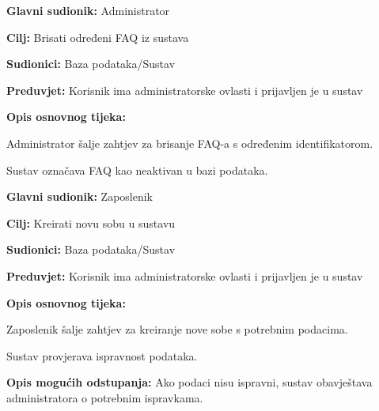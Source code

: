                 \noindent {}
					\begin{packed_item}
	
						\item \textbf{Glavni sudionik: }Administrator
						\item  \textbf{Cilj:} Brisati određeni FAQ iz sustava
						\item  \textbf{Sudionici:} Baza podataka/Sustav
						\item  \textbf{Preduvjet:} Korisnik ima administratorske ovlasti i prijavljen je u sustav
						\item  \textbf{Opis osnovnog tijeka:}
						
						\item[] \begin{packed_enum}
	
							\item Administrator šalje zahtjev za brisanje FAQ-a s određenim identifikatorom.
							\item Sustav označava FAQ kao neaktivan u bazi podataka.
	
						\end{packed_enum}

						
					\end{packed_item}

                \noindent {}
					\begin{packed_item}
	
						\item \textbf{Glavni sudionik: }Zaposlenik
						\item  \textbf{Cilj:} Kreirati novu sobu u sustavu
						\item  \textbf{Sudionici:} Baza podataka/Sustav
						\item  \textbf{Preduvjet:} Korisnik ima administratorske ovlasti i prijavljen je u sustav
						\item  \textbf{Opis osnovnog tijeka:}
						
						\item[] \begin{packed_enum}
	
							\item Zaposlenik šalje zahtjev za kreiranje nove sobe s potrebnim podacima.
							\item Sustav provjerava ispravnost podataka.
	
						\end{packed_enum}
						
						\item  \textbf{Opis mogućih odstupanja:} Ako podaci nisu ispravni, sustav obavještava administratora o potrebnim ispravkama.
						
						
					\end{packed_item}

